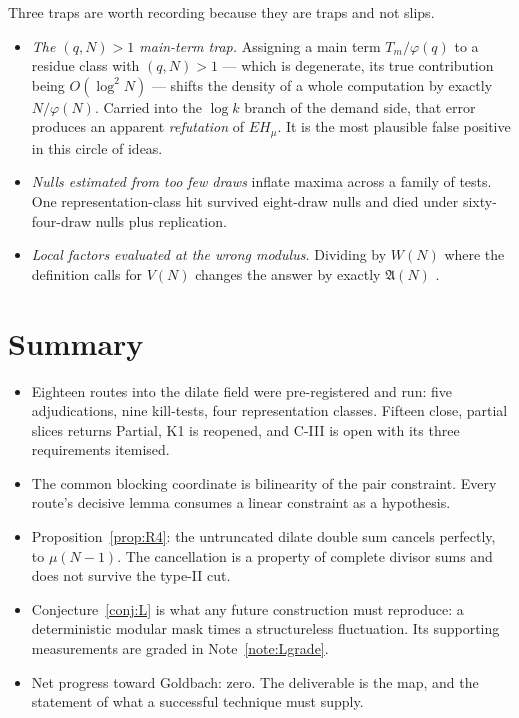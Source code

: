 \documentclass[11pt,a4paper]{article}
\theoremstyle{plain}
\theoremstyle{definition}
\theoremstyle{remark}
\newcommand{\AAA}{\mathfrak{A}}
\begin{document}
Three traps are worth recording because they are traps and not slips.

\begin{itemize}
\item \emph{The $(q,N)>1$ main-term trap.} Assigning a main term
$T_m/\varphi(q)$ to a residue class with $(q,N)>1$ --- which is
degenerate, its true contribution being $O(\log^2N)$ --- shifts the
density of a whole computation by exactly $N/\varphi(N)$. Carried into
the $\log k$ branch of the demand side, that error produces an
apparent \emph{refutation} of $EH_\mu$. It is the most plausible false
positive in this circle of ideas.
\item \emph{Nulls estimated from too few draws} inflate maxima across
a family of tests. One representation-class hit survived eight-draw
nulls and died under sixty-four-draw nulls plus replication.
\item \emph{Local factors evaluated at the wrong modulus.} Dividing by
$W(N)$ where the definition calls for $V(N)$ changes the answer by
exactly $\AAA(N)$ \cite{P3}.
\end{itemize}

\section{Summary}

\begin{itemize}
\item Eighteen routes into the dilate field were pre-registered and
run: five adjudications, nine kill-tests, four representation classes.
Fifteen close, partial slices returns Partial, K1 is reopened, and
C-III is open with its three requirements itemised.

\item The common blocking coordinate is bilinearity of the pair
constraint. Every route's decisive lemma consumes a linear constraint
as a hypothesis.

\item Proposition~\ref{prop:R4}: the untruncated dilate double sum
cancels perfectly, to $\mu(N-1)$. The cancellation is a property of
complete divisor sums and does not survive the type-II cut.

\item Conjecture~\ref{conj:L} is what any future construction must
reproduce: a deterministic modular mask times a structureless
fluctuation. Its supporting measurements are graded in
Note~\ref{note:Lgrade}.

\item Net progress toward Goldbach: zero. The deliverable is the map,
and the statement of what a successful technique must supply.
\end{itemize}
\end{document}
